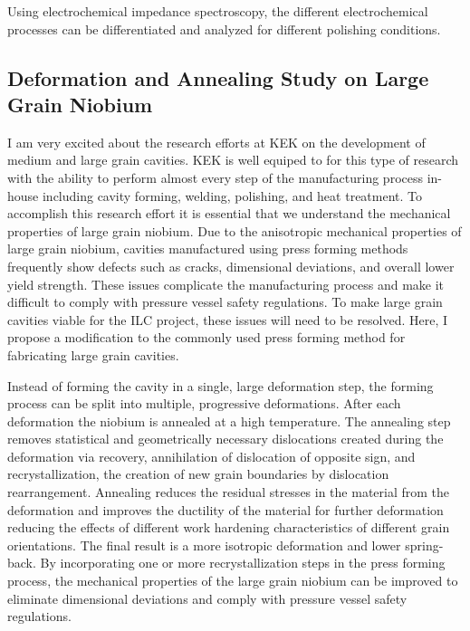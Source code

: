 \documentclass[]{revtex4-2}
\begin{document}
    

    Using electrochemical impedance spectroscopy, the different electrochemical processes can be differentiated and analyzed for different polishing conditions.

\subsection{Deformation and Annealing Study on Large Grain Niobium}

    I am very excited about the research efforts at KEK on the development of medium and large grain cavities. KEK is well equiped to for this type of research with the ability to perform almost every step of the manufacturing process in-house including cavity forming, welding, polishing, and heat treatment. To accomplish this research effort it is essential that we understand the mechanical properties of large grain niobium. Due to the anisotropic mechanical properties of large grain niobium, cavities manufactured using press forming methods frequently show defects such as cracks, dimensional deviations, and overall lower yield strength. These issues complicate the manufacturing process and make it difficult to comply with pressure vessel safety regulations. To make large grain cavities viable for the ILC project, these issues will need to be resolved. Here, I propose a modification to the commonly used press forming method for fabricating large grain cavities.

    Instead of forming the cavity in a single, large deformation step, the forming process can be split into multiple, progressive deformations. After each deformation the niobium is annealed at a high temperature. The annealing step removes statistical and geometrically necessary dislocations created during the deformation via recovery, annihilation of dislocation of opposite sign, and recrystallization, the creation of new grain boundaries by dislocation rearrangement. Annealing reduces the residual stresses in the material from the deformation and improves the ductility of the material for further deformation reducing the effects of different work hardening characteristics of different grain orientations. The final result is a more isotropic deformation and lower spring-back. By incorporating one or more recrystallization steps in the press forming process, the mechanical properties of the large grain niobium can be improved to eliminate dimensional deviations and comply with pressure vessel safety regulations.
\end{document}
